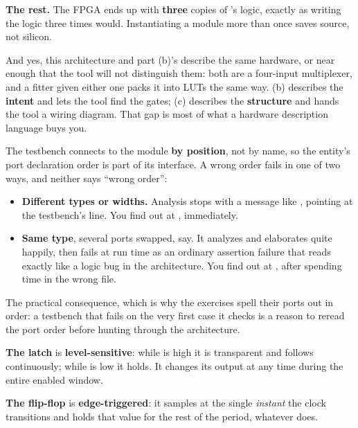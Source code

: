 \textbf{The rest.} The FPGA ends up with \textbf{three} copies of 's logic, exactly as
writing the logic three times would. Instantiating a module more than once saves source, not
silicon.

And yes, this architecture and part (b)'s describe the same hardware, or near enough that the tool
will not distinguish them: both are a four-input multiplexer, and a fitter given either one packs it
into LUTs the same way. (b) describes the \textbf{intent} and lets the tool find the gates; (c)
describes the \textbf{structure} and hands the tool a wiring diagram. That gap is most of what a
hardware description language buys you. 

The testbench connects to the module \textbf{by position}, not by name, so the entity's port
declaration order is part of its interface. A wrong order fails in one of two ways, and neither says
``wrong order'':
\begin{itemize}
  \item \textbf{Different types or widths.} Analysis stops with a message like
    , pointing at the testbench's  line.
    You find out at , immediately.
  \item \textbf{Same type}, several  ports swapped, say. It analyzes and elaborates
    quite happily, then fails at run time as an ordinary assertion failure that reads exactly like a
    logic bug in the architecture. You find out at , after spending time in the wrong
    file.
\end{itemize}

The practical consequence, which is why the exercises spell their ports out in order: a testbench
that fails on the very first case it checks is a reason to reread the port order before hunting
through the architecture.


\textbf{The latch} is \textbf{level-sensitive}: while  is high it is transparent and
 follows  continuously; while  is low it holds. It changes its output at
any time during the entire enabled window.

\textbf{The flip-flop} is \textbf{edge-triggered}: it samples  at the single \emph{instant}
the clock transitions and holds that value for the rest of the period, whatever  does.

